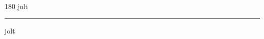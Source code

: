 
\begin{frame}
\begin{center}
\begin{turn}{180}
{\fontsize{2.5cm}{1em}\selectfont jolt}
\end{turn}
\vspace{1em}\par  
\hrule
\vspace{1em}\par  
{\fontsize{2.5cm}{1em}\selectfont jolt}
\end{center}
\end{frame}
